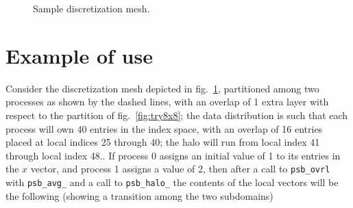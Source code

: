 \begin{figure}[h] \begin{center}
\end{center}
\caption{Sample discretization mesh.\label{fig:try8x8_ov}}
\end{figure}
\section*{Example of use}
Consider the discretization mesh depicted in fig.~\ref{fig:try8x8_ov},
partitioned among two processes as shown by the dashed lines, with an
overlap of 1 extra layer with respect to the partition of
fig.~\ref{fig:try8x8}; the data 
distribution is such that each process will own 40 entries in the
index space, with an overlap of 16  entries placed at local indices 25 
through 40; the halo will run from local index 41 through local index 48.. If process 0 assigns an initial value of 1 to its entries
in the $x$ vector, and process 1 assigns a value of 2, then after a
call to \verb|psb_ovrl| with \verb|psb_avg_| and a call to
\verb|psb_halo_| the contents of the local vectors will be the
following (showing a transition among the two subdomains)  

